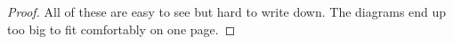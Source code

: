 \documentclass[a4paper]{report}
\theoremstyle{definition}
\theoremstyle{plain}
\theoremstyle{remark}
\begin{document}
\begin{proof}
  All of these are easy to see but hard to write down. The diagrams end up too big to fit comfortably on one page.
%
%
\end{proof}
\end{document}
